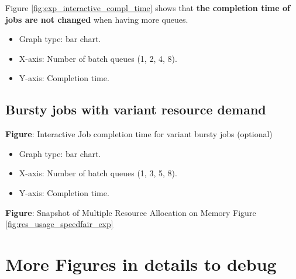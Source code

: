 Figure \ref{fig:exp_interactive_compl_time} shows that \textbf{the completion time of jobs are not changed} when having more queues.

\begin{itemize}
	\item Graph type: bar chart.
	\item X-axis: Number of batch queues (1, 2, 4, 8).
	\item Y-axis: Completion time.
\end{itemize}


\subsection{Bursty jobs with variant resource demand}

\textbf{Figure}: Interactive Job completion time for variant bursty jobs (optional)
\begin{itemize}
	\item Graph type: bar chart.
	\item X-axis: Number of batch queues (1, 3, 5, 8).
	\item Y-axis: Completion time.
\end{itemize}

\textbf{Figure}: Snapshot of Multiple Resource Allocation on Memory  Figure \ref{fig:res_usage_speedfair_exp}




\section{More Figures in details to debug}

